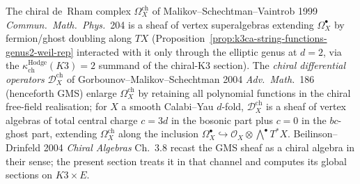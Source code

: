 The chiral de~Rham complex $\Omega^{\mathrm{ch}}_X$ of Malikov--Schechtman--Vaintrob 1999 \emph{Commun.\ Math.\ Phys.}~204 is a sheaf of vertex superalgebras extending $\Omega^\bullet_X$ by fermion/ghost doubling along $TX$ (Proposition~\ref{prop:k3ca-string-functions-genus2-weil-rep} interacted with it only through the elliptic genus at $d=2$, via the $\kappa_{\mathrm{ch}}^{\mathrm{Hodge}}(K3)=2$ summand of the chiral-K3 section). The \emph{chiral differential operators} $\mathcal D^{\mathrm{ch}}_X$ of Gorbounov--Malikov--Schechtman 2004 \emph{Adv.\ Math.}~186 (henceforth GMS) enlarge $\Omega^{\mathrm{ch}}_X$ by retaining all polynomial functions in the chiral free-field realisation; for $X$ a smooth Calabi--Yau $d$-fold, $\mathcal D^{\mathrm{ch}}_X$ is a sheaf of vertex algebras of total central charge $c=3d$ in the bosonic part plus $c=0$ in the $bc$-ghost part, extending $\Omega^{\mathrm{ch}}_X$ along the inclusion $\Omega^\bullet_X\hookrightarrow\mathcal O_X\otimes\bigwedge^\bullet T^*X$. Beilinson--Drinfeld 2004 \emph{Chiral Algebras} Ch.~3.8 recast the GMS sheaf as a chiral algebra in their sense; the present section treats it in that channel and computes its global sections on $K3\times E$.

